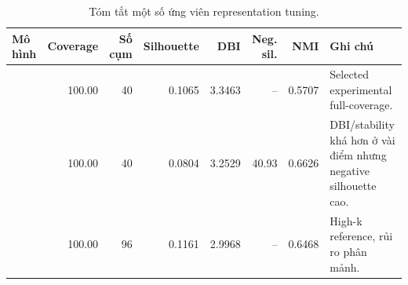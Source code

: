 \begin{table}[H]
\centering
\scriptsize
\caption{Tóm tắt một số ứng viên representation tuning.}
\label{tab:representation-tuning-summary}
\begin{tabularx}{\textwidth}{L{0.34\textwidth} r r r r r r Y}
\toprule
Mô hình & Coverage & Số cụm & Silhouette & DBI & Neg. sil. & NMI & Ghi chú \\
\midrule
{} & 100.00 & 40 & 0.1065 & 3.3463 & -- & 0.5707 & Selected experimental full-coverage. \\
 & 100.00 & 40 & 0.0804 & 3.2529 & 40.93 & 0.6626 & DBI/stability khá hơn ở vài điểm nhưng negative silhouette cao. \\
 & 100.00 & 96 & 0.1161 & 2.9968 & -- & 0.6468 & High-k reference, rủi ro phân mảnh. \\
\bottomrule
\end{tabularx}
\end{table}
